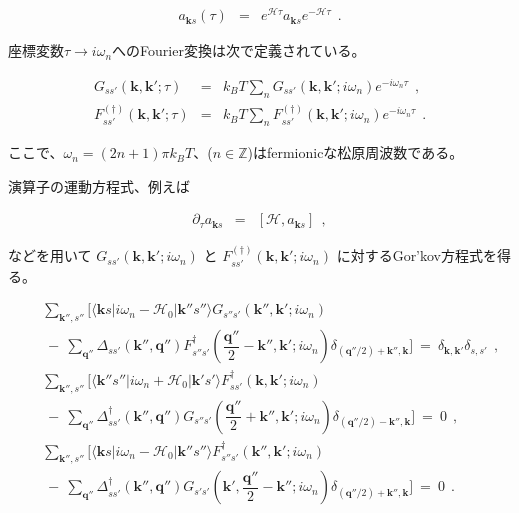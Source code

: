 \documentclass[uplatex,a4j,12pt,dvipdfmx]{jsarticle}
\begin{document}
\begin{eqnarray}
	a_{\bm{k}s}(\tau)
	&=&
	e^{ \mathcal{H} \tau } a_{\bm{k}s} e^{ - \mathcal{H} \tau }
	\ \ .
	\nonumber
\end{eqnarray}

座標変数$\tau \to i \omega_{n}$へのFourier変換は次で定義されている。

\begin{eqnarray}
	G_{ss'}(\bm{k} , \bm{k}' ; \tau)
	&=&
	k_{B} T \sum_{n}
	G_{ss'}(\bm{k} , \bm{k}' ; i \omega_{n} )
	e^{- i \omega_{n} \tau }
	\ \ , \nonumber \\[2mm]
	F_{ss'}^{(\dagger)}(\bm{k} , \bm{k}' ; \tau)
	&=&
	k_{B} T \sum_{n}
	F_{ss'}^{(\dagger)}(\bm{k} , \bm{k}' ; i \omega_{n} )
	e^{- i \omega_{n} \tau }
	\ \ .
\end{eqnarray}

ここで、$\omega_{n}=(2n+1)\pi k_{B} T$、($n \in \mathbb{Z}$)はfermionicな松原周波数である。

演算子の運動方程式、例えば

\begin{eqnarray}
	\partial_{\tau} a_{\bm{k}s}
	&=&
	[\mathcal{H},a_{\bm{k}s}]
	\nonumber
	\ \ ,
\end{eqnarray}

などを用いて
$G_{ss'}(\bm{k} , \bm{k}' ; i \omega_{n} )$
と
$F_{ss'}^{(\dagger)}(\bm{k} , \bm{k}' ; i \omega_{n} )$
に対するGor'kov方程式を得る。

\begin{eqnarray}
	&&
	\sum_{\bm{k}'',s''}
	\Big[
		\langle \bm{k} s | i \omega_{n} - \mathcal{H}_{0} | \bm{k}'' s'' \rangle
		G_{s''s'}(\bm{k}'' , \bm{k}' ; i \omega_{n} )
		\\ && \ - \
		\sum_{\bm{q}''}
		\Delta_{s s'}(\bm{k}'',\bm{q}'') F_{s'' s'}^{\dagger}
		(\dfrac{\bm{q}''}{2} - \bm{k}'' , \bm{k}' ; i \omega_{n})
		\delta_{(\bm{q}''/2)+\bm{k}'',\bm{k}}
		\Big]
	\ = \
	\delta_{\bm{k},\bm{k}'}
	\delta_{s,s'}
	\ \ , \\[2mm]
	&&
	\sum_{\bm{k}'',s''}
	\Big[
		\langle \bm{k}'' s'' | i \omega_{n} + \mathcal{H}_{0} | \bm{k}' s' \rangle
		F_{ss'}^{\dagger}(\bm{k} , \bm{k}' ; i \omega_{n} )
		\\ && \ - \
		\sum_{\bm{q}''}
		\Delta_{s s'}^{\dagger}(\bm{k}'',\bm{q}'') G_{s'' s'}
		(\dfrac{\bm{q}''}{2} + \bm{k}'' , \bm{k}' ; i \omega_{n})
		\delta_{(\bm{q}''/2)-\bm{k}'',\bm{k}}
		\Big]
	\ = \
	0
	\ \ , \\[2mm]
	&&
	\sum_{\bm{k}'',s''}
	\Big[
		\langle \bm{k} s | i \omega_{n} - \mathcal{H}_{0} | \bm{k}'' s'' \rangle
		F_{s''s'}^{\dagger}(\bm{k}'' , \bm{k}' ; i \omega_{n} )
		\\ && \ - \
		\sum_{\bm{q}''}
		\Delta_{s s'}^{\dagger}(\bm{k}'',\bm{q}'') G_{s' s'}
		(\bm{k}' , \dfrac{\bm{q}''}{2} - \bm{k}'' ; i \omega_{n})
		\delta_{(\bm{q}''/2)+\bm{k}'',\bm{k}}
		\Big]
	\ = \
	0
	\ \ .
	\label{eqn:B7}
\end{eqnarray}
\end{document}
